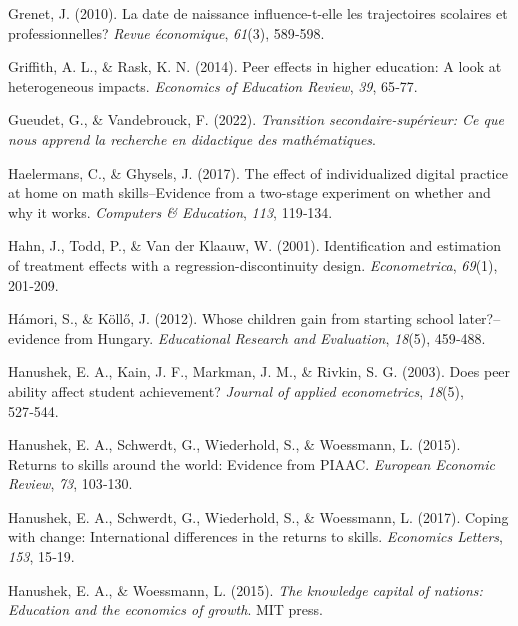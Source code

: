 \documentclass[
]{book}
\newlength{\cslhangindent}
\newlength{\cslentryspacingunit} %
\newenvironment{CSLReferences}[2] %
 {%
  \setlength{\parindent}{0pt}
  \ifodd #1
  \let\oldpar\par
  \def\par{\hangindent=\cslhangindent\oldpar}
  \fi
  \setlength{\parskip}{#2\cslentryspacingunit}
 }%
 {}
\begin{document}
\begin{CSLReferences}{1}{2}
\leavevmode{}%
Grenet, J. (2010). La date de naissance influence-t-elle les trajectoires scolaires et professionnelles? \emph{Revue {é}conomique}, \emph{61}(3), 589‑598.

\leavevmode{}%
Griffith, A. L., \& Rask, K. N. (2014). Peer effects in higher education: A look at heterogeneous impacts. \emph{Economics of Education Review}, \emph{39}, 65‑77.

\leavevmode{}%
Gueudet, G., \& Vandebrouck, F. (2022). \emph{Transition secondaire-sup{é}rieur: Ce que nous apprend la recherche en didactique des math{é}matiques}.

\leavevmode{}%
Haelermans, C., \& Ghysels, J. (2017). The effect of individualized digital practice at home on math skills--Evidence from a two-stage experiment on whether and why it works. \emph{Computers \& Education}, \emph{113}, 119‑134.

\leavevmode{}%
Hahn, J., Todd, P., \& Van der Klaauw, W. (2001). Identification and estimation of treatment effects with a regression-discontinuity design. \emph{Econometrica}, \emph{69}(1), 201‑209.

\leavevmode{}%
Hámori, S., \& Köllő, J. (2012). Whose children gain from starting school later?--evidence from Hungary. \emph{Educational Research and Evaluation}, \emph{18}(5), 459‑488.

\leavevmode{}%
Hanushek, E. A., Kain, J. F., Markman, J. M., \& Rivkin, S. G. (2003). Does peer ability affect student achievement? \emph{Journal of applied econometrics}, \emph{18}(5), 527‑544.

\leavevmode{}%
Hanushek, E. A., Schwerdt, G., Wiederhold, S., \& Woessmann, L. (2015). Returns to skills around the world: Evidence from PIAAC. \emph{European Economic Review}, \emph{73}, 103‑130.

\leavevmode{}%
Hanushek, E. A., Schwerdt, G., Wiederhold, S., \& Woessmann, L. (2017). Coping with change: International differences in the returns to skills. \emph{Economics Letters}, \emph{153}, 15‑19.

\leavevmode{}%
Hanushek, E. A., \& Woessmann, L. (2015). \emph{The knowledge capital of nations: Education and the economics of growth}. MIT press.


\end{CSLReferences}
\end{document}
